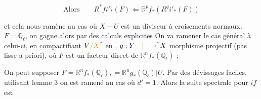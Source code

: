 \[ \text{Alors}\qquad R^*fi'_*(F)\Longleftarrow \mathbb R^p f_*(R^q i'_*(F)) \]

et cela nous ramène  au cas où  $X-U$ est un diviseur à croisements normaux.  $F=\mathbb Q_\ell$, on gagne alors par des calculs explicites  On va ramener le cas général à celui-ci, en compactifiant $V\deleted{\unsure{/X}}$ en , $g:Y\unsure{\text{---}|\longrightarrow}X$ morphisme projectif (pas lisse a priori), où $F$ est un facteur direct de $\mathbb R^nf_*(\mathbb Q_\ell)$ ; 


On peut supposer $F=\mathbb R^n f_*(\mathbb Q_\ell),=\mathbb R^n g_*(\mathbb Q_\ell)|U$. Par des dévissages faciles, utilisant lemme 3 on est ramené au cas où $d'=1$. Alors la suite spectrale pour $if$ est



